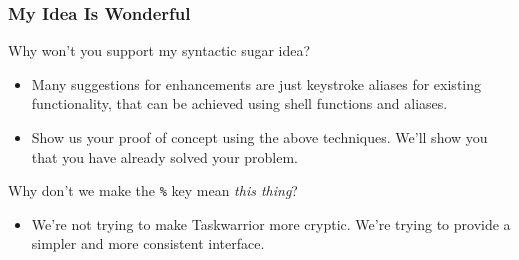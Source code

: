 \documentclass[t,handout]{beamer}
\begin{document}

\begin{frame}[fragile]\frametitle{My Idea Is Wonderful}
    \vfill
    Why won't you support my syntactic sugar idea?
    \begin{itemize}
        \item Many suggestions for enhancements are just keystroke aliases for existing functionality, that can be achieved using shell functions and aliases.
        \item Show us your proof of concept using the above techniques. We'll show you that you have already solved your problem.
    \end{itemize}

    Why don't we make the \verb=%= key mean \textit{this thing}?
    \begin{itemize}
        \item We're not trying to make Taskwarrior more cryptic. We're trying to provide a simpler and more consistent interface.
    \end{itemize}
\end{frame}
\end{document}
